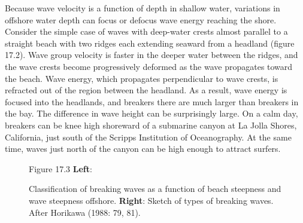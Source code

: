 Because wave velocity is a function of depth in shallow water,
variations in offshore water depth can focus or defocus wave energy
reaching the shore. Consider the simple case of waves with deep-water
crests almost parallel to a straight beach with two ridges each
extending seaward from a headland (figure 17.2). Wave group velocity
is faster in the deeper water between the ridges, and the wave crests
become progressively deformed as the wave propagates toward the
beach. Wave energy, which propagates perpendicular to wave crests, is
refracted out of the region between the headland. As a result, wave
energy is focused into the headlands, and
breakers there are much larger than breakers
in the bay. The difference in wave height can be surprisingly
large. On a calm day, breakers can be knee high shoreward of a
submarine canyon at La Jolla Shores, California, just south of the
Scripps Institution of Oceanography. At the same time, waves just
north of the canyon can be high enough to attract surfers.

\begin{figure}[t!]
\centering
{}
\footnotesize
Figure 17.3 \textbf{Left}:
\rule{0mm}{3ex}Classification of breaking
waves as a function of beach steepness and wave steepness
offshore. \textbf{Right}: Sketch of types of breaking waves. After
Horikawa (1988: 79, 81).

\label{fig:breakers}
\vspace{-3ex}
\end{figure}

